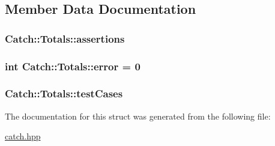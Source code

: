 \subsection{Member Data Documentation}
\hypertarget{struct_catch_1_1_totals_a885ded66df752147b30c3d45aa602ec9}{
\subsubsection[{assertions}]{ Catch\-::\-Totals\-::assertions}}\label{struct_catch_1_1_totals_a885ded66df752147b30c3d45aa602ec9}
\hypertarget{struct_catch_1_1_totals_a6ea14c7de7ea735a14f172a26e08a239}{
\subsubsection[{error}]{\setlength{\rightskip}{0pt plus 5cm}int Catch\-::\-Totals\-::error = 0}}\label{struct_catch_1_1_totals_a6ea14c7de7ea735a14f172a26e08a239}
\hypertarget{struct_catch_1_1_totals_adb195fe477aedee2ecea88c888f16506}{
\subsubsection[{test\-Cases}]{ Catch\-::\-Totals\-::test\-Cases}}\label{struct_catch_1_1_totals_adb195fe477aedee2ecea88c888f16506}


The documentation for this struct was generated from the following file\-:\begin{DoxyCompactItemize}
\item 
\hyperlink{catch_8hpp}{catch.\-hpp}\end{DoxyCompactItemize}
